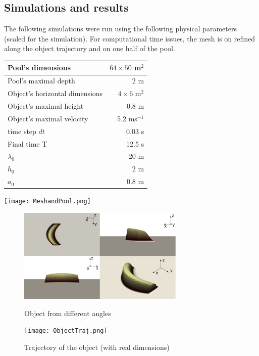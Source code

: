 \documentclass[11pt,a4paper]{article}
\begin{document}
\subsection{Simulations and results}
	The following simulations were run using the following physical parameters (scaled for the simulation). For computational time issues, the mesh is on refined along the object trajectory and on one half of the pool.\\
	\begin{minipage}[t]{0.5\linewidth}
		\vspace{0pt}
		\begin{tabular}{|l|r|}
			\hline
			Pool's dimensions & $64\times50$ m$^2$	\\
			\hline
			Pool's maximal depth & $2$ m \\
			\hline
			Object's horizontal dimensions & $4\times6$ m$^2$\\
			\hline
			Object's maximal height & 0.8 m\\
			\hline
			Object's maximal velocity & 5.2 ms$^{-1}$\\
			\hline
			time step $dt$ & 0.03 s \\
			\hline		
			Final time T & 12.5 s\\
			\hline
			$\lambda_0$ & 20 m \\
			\hline
			$h_0$ & 2 m\\
			\hline
			$a_0$ & 0.8 m\\
			\hline
		\end{tabular}
	\end{minipage}
	\hfill
	\begin{minipage}[t]{0.5\linewidth}
		\vspace{0pt}
		\centering
		\texttt{[image: MeshandPool.png]}
	\end{minipage}
	\linebreak
	\begin{figure}[!h]
		\begin{minipage}[t]{0.5\linewidth}
			\centering
			\includegraphics[height=4.5cm]{ObjectUsedModified.png}
			\caption{Object from different angles}
		\end{minipage}
		\hspace{10pt}
		\begin{minipage}[t]{0.5\linewidth}
			\centering
			\texttt{[image: ObjectTraj.png]}
			\caption{Trajectory of the object (with real dimensions)}
		\end{minipage}
	\end{figure}
\end{document}
